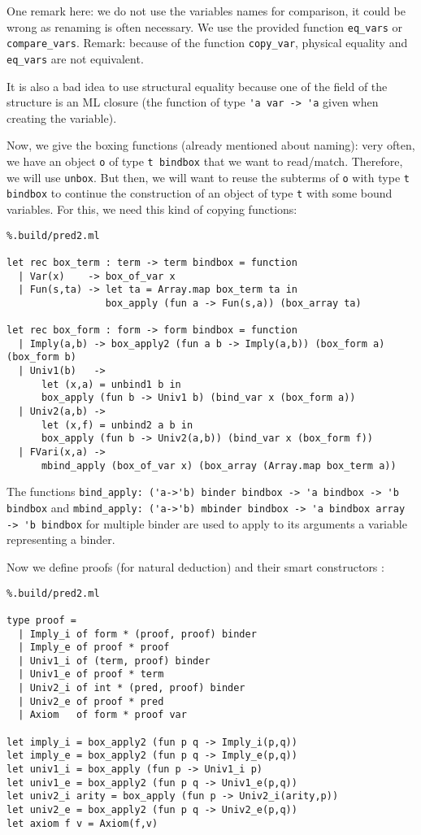 \documentclass[11pt]{article}
\begin{document}
One remark here: we do not use the variables names for comparison,
it could be wrong as renaming is often necessary. We use the
provided
function \verb#eq_vars# or \verb#compare_vars#.
Remark: because of the function \verb#copy_var#, physical equality
and \verb#eq_vars# are not equivalent.

It is also a bad idea to use structural equality because
one of the field of the structure is an ML
closure (the function of type \verb#'a var -> 'a# given when
creating the variable).

Now, we give the boxing functions (already mentioned about naming): very often, we have
an object \verb#o# of type \verb#t bindbox# that we want to
read/match. Therefore, we will use \verb#unbox#.
But then, we will want to reuse the subterms of \verb#o# with
type  \verb#t bindbox# to continue the construction of an object of
type \verb#t# with some bound variables. For this, we need this kind
of copying functions:

\begin{lstlisting}%.build/pred2.ml

let rec box_term : term -> term bindbox = function
  | Var(x)    -> box_of_var x
  | Fun(s,ta) -> let ta = Array.map box_term ta in
                 box_apply (fun a -> Fun(s,a)) (box_array ta)

let rec box_form : form -> form bindbox = function
  | Imply(a,b) -> box_apply2 (fun a b -> Imply(a,b)) (box_form a) (box_form b)
  | Univ1(b)   ->
      let (x,a) = unbind1 b in
      box_apply (fun b -> Univ1 b) (bind_var x (box_form a))
  | Univ2(a,b) ->
      let (x,f) = unbind2 a b in
      box_apply (fun b -> Univ2(a,b)) (bind_var x (box_form f))
  | FVari(x,a) ->
      mbind_apply (box_of_var x) (box_array (Array.map box_term a))
\end{lstlisting}

The functions
\verb#bind_apply: ('a->'b) binder bindbox -> 'a bindbox -> 'b bindbox# and
\verb#mbind_apply: ('a->'b) mbinder bindbox -> 'a bindbox array -> 'b bindbox#
for multiple binder are
used to apply to its arguments a variable representing a binder.

Now we define proofs (for natural deduction) and their smart
constructors :
\begin{lstlisting}%.build/pred2.ml

type proof =
  | Imply_i of form * (proof, proof) binder
  | Imply_e of proof * proof
  | Univ1_i of (term, proof) binder
  | Univ1_e of proof * term
  | Univ2_i of int * (pred, proof) binder
  | Univ2_e of proof * pred
  | Axiom   of form * proof var

let imply_i = box_apply2 (fun p q -> Imply_i(p,q))
let imply_e = box_apply2 (fun p q -> Imply_e(p,q))
let univ1_i = box_apply (fun p -> Univ1_i p)
let univ1_e = box_apply2 (fun p q -> Univ1_e(p,q))
let univ2_i arity = box_apply (fun p -> Univ2_i(arity,p))
let univ2_e = box_apply2 (fun p q -> Univ2_e(p,q))
let axiom f v = Axiom(f,v)
\end{lstlisting}
\end{document}

